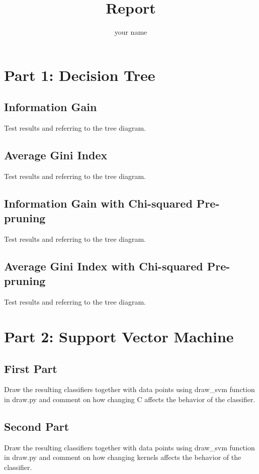 \documentclass{article}
\title{Report}
\author{your name}
\begin{document}
\maketitle
\section{Part 1: Decision Tree}
\subsection{Information Gain}
Test results and referring to the tree diagram.

\subsection{Average Gini Index}
Test results and referring to the tree diagram.

\subsection{Information Gain with Chi-squared Pre-pruning}
Test results and referring to the tree diagram.

\subsection{Average Gini Index with Chi-squared Pre-pruning}
Test results and referring to the tree diagram.


\maketitle
\section{Part 2: Support Vector Machine}
\subsection{First Part}
Draw the resulting classifiers together with data points using draw\_svm function in draw.py and comment on how changing C affects the behavior of the classifier.

\subsection{Second Part}
Draw the resulting classifiers together with data points using draw\_svm function in draw.py and comment on how changing kernels affects the behavior of the classifier.
\end{document}
